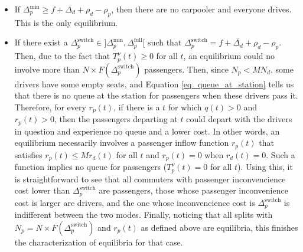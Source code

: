 \documentclass[english, a4paper]{article}
\theoremstyle{plain}
\theoremstyle{definition}
\theoremstyle{remark}
\begin{document}
\begin{itemize}
    \item If $\Delta _p^{\text{min}} \geq f + \overline{\Delta _d} + \rho _d - \rho _p$, then there are no carpooler and everyone drives. This is the only equilibrium.
    
    \item If there exist a $\Delta _p^{\text{switch}} \in ]\Delta _p^{\text{min}}, \Delta _p^{\text{full}}[$ such that $\Delta _p^{\text{switch}} = f + \overline{\Delta _d} + \rho _d - \rho _p$. Then, due to the fact that $T^{\nu}_p(t) \geq 0$ for all $t$, an equilibrium could no involve more than $N\times F(\Delta _p^{\text{switch}})$ passengers. Then, since $N_p < MN_d$, some drivers have some empty seats, and Equation \ref{eq_queue_at_station} tells us that there is no queue at the station for passengers when these drivers pass it. Therefore, for every $r _p(t)$, if there is a $t$ for which $q(t) > 0$ and $r_p(t) > 0$, then the passengers departing at $t$ could depart with the drivers in question and experience no queue and a lower cost. In other words, an equilibrium necessarily involves a passenger inflow function $r_p(t)$ that satisfies $r_p(t) \leq M r_d(t)$ for all $t$ and $r_p(t) = 0$ when $r_d(t) = 0$. Such a function implies no queue for passengers ($T^{\nu}_p (t) = 0$ for all $t$). Using this, it is straightforward to see that all commuters with passenger inconvencience cost lower than $\Delta _p^{\text{switch}}$ are passengers, those whose passenger inconvenience cost is larger are drivers, and the one whose inconvencience cost is $\Delta _p^{\text{switch}}$ is indifferent between the two modes. Finally, noticing that all splits with $N_p = N\times F(\Delta _p^{\text{switch}})$ and $r_p(t)$ as defined above are equilibria, this finishes the characterization of equilibria for that case.
    

\end{itemize}
\end{document}
